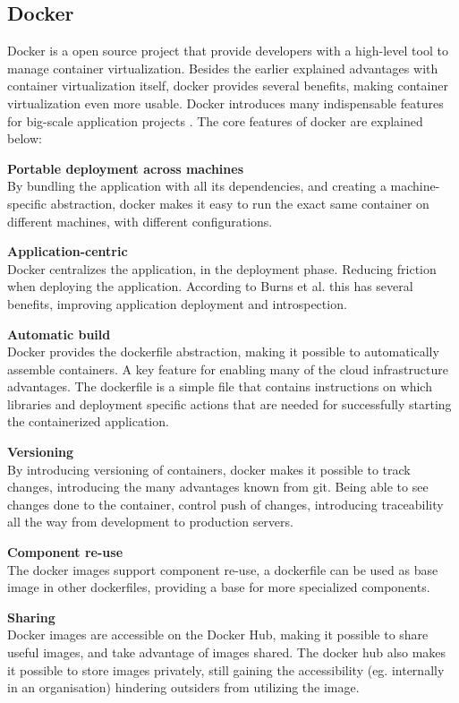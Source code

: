 \subsection{Docker}
\label{sec:docker}
Docker is a open source project that provide developers with a high-level tool to manage container virtualization. Besides the earlier explained advantages with container virtualization itself, docker provides several benefits, making container virtualization even more usable. Docker introduces many indispensable features for big-scale application projects \cite{dockerFAQ}. The core features of docker are explained below:

\textbf{Portable deployment across machines}\\
By bundling the application with all its dependencies, and creating a machine-specific abstraction, docker makes it easy to run the exact same container on different machines, with different configurations.

\textbf{Application-centric}\\
Docker centralizes the application, in the deployment phase. Reducing friction when deploying the application. According to Burns et al. \cite{burns2016borg} this has several benefits, improving application deployment and introspection.

\textbf{Automatic build}\\
Docker provides the dockerfile abstraction, making it possible to automatically assemble containers. A key feature for enabling many of the cloud infrastructure advantages. The dockerfile is a simple file that contains instructions on which libraries and deployment specific actions that are needed for successfully starting the containerized application.

\textbf{Versioning}\\
By introducing versioning of containers, docker makes it possible to track changes, introducing the many advantages known from git. Being able to see changes done to the container, control push of changes, introducing traceability all the way from development to production servers.

\textbf{Component re-use}\\
The docker images support component re-use, a dockerfile can be used as base image in other dockerfiles, providing a base for more specialized components.

\textbf{Sharing}\\
Docker images are accessible on the Docker Hub, making it possible to share useful images, and take advantage of images shared. The docker hub also makes it possible to store images privately, still gaining the accessibility (eg. internally in an organisation) hindering outsiders from utilizing the image.

